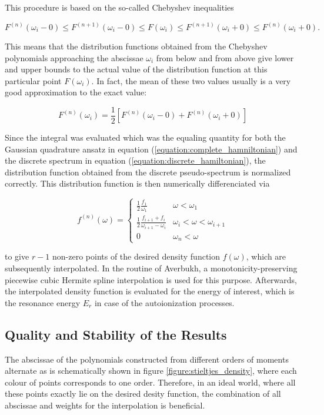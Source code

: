 This procedure is based on the so-called Chebyshev inequalities

\begin{equation} \label{equation:Chebyshev_inequalities}
  F^{(n)}(\omega_i - 0) \le F^{(n+1)}(\omega_i - 0) \le F(\omega_i)
  \le F^{(n+1)}(\omega_i + 0) \le F^{(n)}(\omega_i + 0).
\end{equation}

This means that the distribution functions obtained from the Chebyshev
polynomials approaching the abscissae $\omega_i$ from below and from above
give lower and upper bounds to the actual value of the distribution
function at this particular point $F(\omega_i)$. In fact, the mean of these
two values usually is a very good approximation to the exact value:

\begin{equation}
  F^{(n)} (\omega_i) = \frac 12 \left[ F^{(n)} (\omega_i - 0)
                       + F^{(n)} (\omega_i+0) \right]
\end{equation}

Since the integral was evaluated
which was the equaling quantity for both the Gaussian quadrature ansatz
in equation (\ref{equation:complete_hamniltonian}) and the discrete spectrum in equation
(\ref{equation:discrete_hamiltonian}), the distribution function obtained from the
discrete pseudo-spectrum is normalized correctly.
This distribution function is then numerically differenciated via

\begin{equation}
  f^{(n)} (\omega) =
  \begin{cases}
    \frac 12 \frac{f_1}{\omega_1}    & \omega < \omega_1\\
    \frac 12 \frac{f_{i+1} + f_i}{\omega_{i+1} - \omega_i}
                                     & \omega_i < \omega < \omega_{i+1}\\
    0                                & \omega_n < \omega
  \end{cases}
\end{equation}

to give  $r-1$ non-zero points of the desired
density function $f(\omega)$, which are
subsequently interpolated. In the routine of Averbukh, a 
monotonicity-preserving piecewise cubic Hermite spline interpolation
is used for this purpose. Afterwards, the interpolated density function is evaluated
for the energy of interest, which is the resonance energy $E_r$ in case of the
autoionization processes.

\subsection{Quality and Stability of the Results} \label{section:quality_stieltjes}
The abscissae of the polynomials constructed from different orders
of moments alternate as is schematically shown in
figure \ref{figure:stieltjes_density}, where each colour of points corresponds
to one order. Therefore, in an ideal world, where all these points exactly lie
on the desired desity function, the combination of all abscissae
and weights for the interpolation is beneficial.

